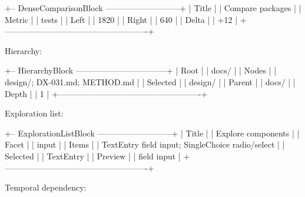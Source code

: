 \begin{CodeBlock}
+-- DenseComparisonBlock ---------------------------+
| Title                                              |
|   Compare packages                                 |
| Metric                                             |
|   tests                                            |
| Left                                               |
|   1820                                             |
| Right                                              |
|   640                                              |
| Delta                                              |
|   +12                                              |
+----------------------------------------------------+
\end{CodeBlock}

Hierarchy:

\begin{CodeBlock}
+-- HierarchyBlock ---------------------------------+
| Root                                               |
|   docs/                                            |
| Nodes                                              |
|   design/; DX-031.md; METHOD.md                    |
| Selected                                           |
|   design/                                          |
| Parent                                             |
|   docs/                                            |
| Depth                                              |
|   1                                                |
+----------------------------------------------------+
\end{CodeBlock}

Exploration list:

\begin{CodeBlock}
+-- ExplorationListBlock ---------------------------+
| Title                                              |
|   Explore components                               |
| Facet                                              |
|   input                                            |
| Items                                              |
|   TextEntry field input; SingleChoice radio/select |
| Selected                                           |
|   TextEntry                                        |
| Preview                                            |
|   field input                                      |
+----------------------------------------------------+
\end{CodeBlock}

Temporal dependency:

